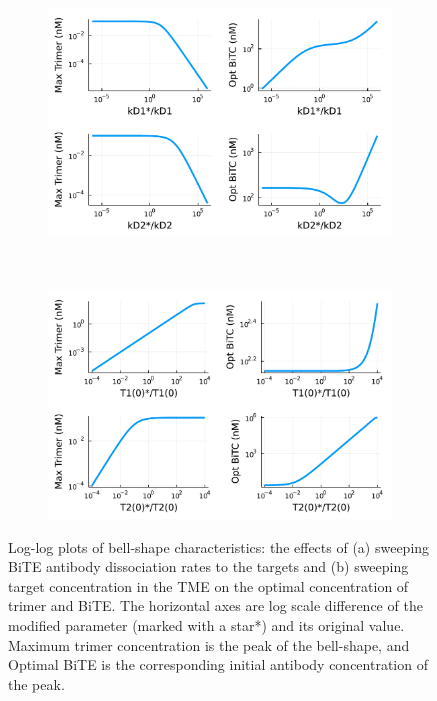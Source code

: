 \begin{figure}
	\centering
	\begin{subfigure}[b]{0.8\textwidth}
		\centering
		\includegraphics[width=1\textwidth]{fig/Dish_3.pdf}
		\caption{}
		\label{fig:5}
	\end{subfigure} \\
	\begin{subfigure}[b]{0.8\textwidth}
		\centering
		\includegraphics[width=1\textwidth]{fig/Dish_4.pdf}
		\caption{}
		\label{fig:6}
	\end{subfigure}
	\caption[Bell-shape characteristics]{Log-log plots of bell-shape characteristics: the effects of (a) sweeping \ac{BiTE} antibody dissociation rates to the targets and (b) sweeping target concentration in the \ac{TME} on the optimal concentration of trimer and \ac{BiTE}. The horizontal axes are log scale difference of the modified parameter (marked with a star*) and its original value. Maximum trimer concentration is the peak of the bell-shape, and Optimal \ac{BiTE} is the corresponding initial antibody concentration of the peak.}
	\label{fig:dish}
\end{figure}

